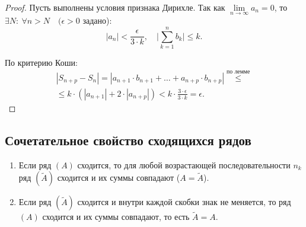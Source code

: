 \begin{proof}
    Пусть выполнены условия признака Дирихле. Так как $\underset{n\rightarrow\infty}{\lim}a_n = 0$, то $\exists N: \ \forall n > N \quad (\epsilon > 0$ задано):
    \[
        |a_n| < \frac{\epsilon}{3 \cdot k}, \quad \bigg|\sum_{k=1}^{n}b_k\bigg| \leqslant k.
    \]

    По критерию Коши:
    \begin{multline*}
        |S_{n+p} - S_n| = |a_{n+1} \cdot b_{n+1} + \ldots + a_{n+p} \cdot b_{n+p}| \overset{\text{по лемме}}{\leqslant} \\
        \leqslant k\cdot(|a_{n+1}| + 2\cdot |a_{n+p}|) < k\cdot \frac{3\cdot \epsilon}{3 \cdot k} = \epsilon.
    \end{multline*}
\end{proof}

\subsection{Сочетательное свойство сходящихся рядов}

\begin{theorem}\leavevmode
    \begin{enumerate}
        \item Если ряд $(A)$ сходится, то для любой возрастающей последовательности $n_k$ ряд $(\widetilde{A})$ сходится и их суммы совпадают ($A = \widetilde{A}$).
        \item Если ряд $(\widetilde{A})$ сходится и внутри каждой  скобки знак не меняется, то ряд $(A)$ сходится и их суммы совпадают, то есть $\widetilde{A} = A$.
    \end{enumerate}
\end{theorem}

